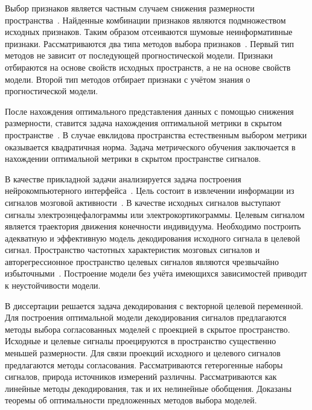 Выбор признаков является частным случаем снижения размерности пространства~\cite{katrutsa2017comprehensive,katrutsa2015stress}. 
Найденные комбинации признаков являются подмножеством исходных признаков.
Таким образом отсеиваются шумовые неинформативные признаки.
Рассматриваются два типа методов выбора признаков~\cite{li2017feature,rodriguez2010quadratic,friedman2001elements}.
Первый тип методов не зависит от последующей прогностической модели.
Признаки отбираются на основе свойств исходных пространств, а не на основе свойств модели.
Второй тип методов отбирает признаки с учётом знания о прогностической модели. 

После нахождения оптимального представления данных с помощью снижения размерности, ставится задача нахождения оптимальной метрики в скрытом пространстве~\cite{wang2017deep,davis2007information,kulis2012metric,yang2006distance,weinberger2009distance}.
В случае евклидова пространства естественным выбором метрики оказывается квадратичная норма.
Задача метрического обучения заключается в нахождении оптимальной метрики в скрытом пространстве сигналов.

В качестве прикладной задачи анализируется задача построения нейрокомпьютерного интерфейса~\cite{wolpaw2000brain,allison2007brain}. 
Цель состоит в извлечении информации из сигналов мозговой активности~\cite{nagel2018modelling,zhang2020survey,chiarelli2018deep}. 
В качестве исходных сигналов выступают сигналы электроэнцефалограммы или электрокортикограммы. 
Целевым сигналом является траектория движения конечности индивидуума.
Необходимо построить адекватную и эффективную модель декодирования исходного сигнала в целевой сигнал.
Пространство частотных характеристик мозговых сигналов и авторегрессионное пространство целевых сигналов являются чрезвычайно избыточными~\cite{eliseyev2013recursive,eliseyev2011iterative}. 
Построение модели без учёта имеющихся зависимостей приводит к неустойчивости модели.

В диссертации решается задача декодирования с векторной целевой переменной. 
Для построения оптимальной модели декодирования сигналов предлагаются методы выбора согласованных моделей с проекцией в скрытое пространство.
Исходные и целевые сигналы проецируются в пространство существенно меньшей размерности. 
Для связи проекций исходного и целевого сигналов предлагаются методы согласования.
Рассматриваются гетерогенные наборы сигналов, природа источников измерений различны.
Рассматриваются как линейные методы декодирования, так и их нелинейные обобщения.
Доказаны теоремы об оптимальности предложенных методов выбора моделей.

